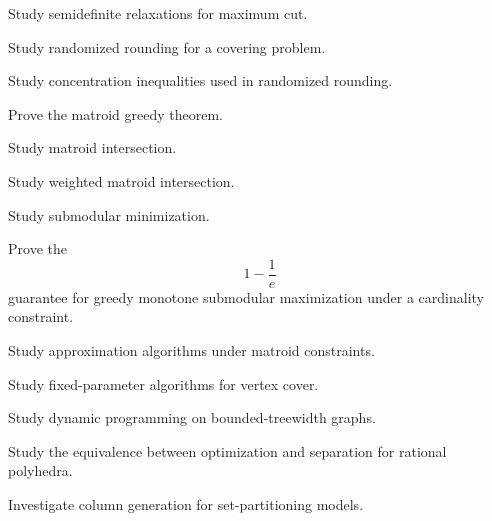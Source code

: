 \begin{exercise}[4]
Study semidefinite relaxations for maximum cut.
\end{exercise}

\begin{exercise}[4]
Study randomized rounding for a covering problem.
\end{exercise}

\begin{exercise}[4]
Study concentration inequalities used in randomized rounding.
\end{exercise}

\begin{exercise}[4]
Prove the matroid greedy theorem.
\end{exercise}

\begin{exercise}[4]
Study matroid intersection.
\end{exercise}

\begin{exercise}[4]
Study weighted matroid intersection.
\end{exercise}

\begin{exercise}[4]
Study submodular minimization.
\end{exercise}

\begin{exercise}[4]
Prove the
\[
1-\frac1e
\]
guarantee for greedy monotone submodular maximization under a cardinality
constraint.
\end{exercise}

\begin{exercise}[4]
Study approximation algorithms under matroid constraints.
\end{exercise}

\begin{exercise}[4]
Study fixed-parameter algorithms for vertex cover.
\end{exercise}

\begin{exercise}[4]
Study dynamic programming on bounded-treewidth graphs.
\end{exercise}

\begin{exercise}[4]
Study the equivalence between optimization and separation for rational
polyhedra.
\end{exercise}

\begin{exercise}[4]
Investigate column generation for set-partitioning models.
\end{exercise}

